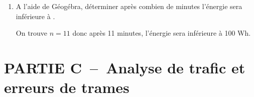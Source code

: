 \begin{enumerate}[series=monDS, resume]
\begin{minipage}{0.44\textwidth}
    \end{minipage}\hfill{}
    \begin{minipage}{0.48\textwidth}
\begin{tcblisting}{%
  listing only,
  colback=white, 
  colupper=black, 
  title=Algorithme de recherche de seuil,
  boxsep=0pt,
  left=5mm,
  listing options={
    numbers=none,
    basicstyle=\ttfamily,
    escapeinside={(*}{*)},
    literate={<-}{{$\bm{\leftarrow}$}}2, %
    frame=none %
    }
}
n <- 0
u <- 120
tant que (**):
        u <- (**)
        n <- (**)
afficher (n)
\end{tcblisting}
    \end{minipage}

    

\medskip

\item A l'aide de Géogébra, déterminer après combien de minutes l'énergie sera inférieure à .
\begin{blocvisiblex}[height=1]
{\quad}
On trouve $n=11$ donc après 11 minutes, l'énergie sera inférieure à 100 Wh.
\end{blocvisiblex}

\appelprof{}
\end{enumerate}

\pagebreak

\section*{PARTIE C~--~Analyse de trafic et erreurs de trames}


\medskip

